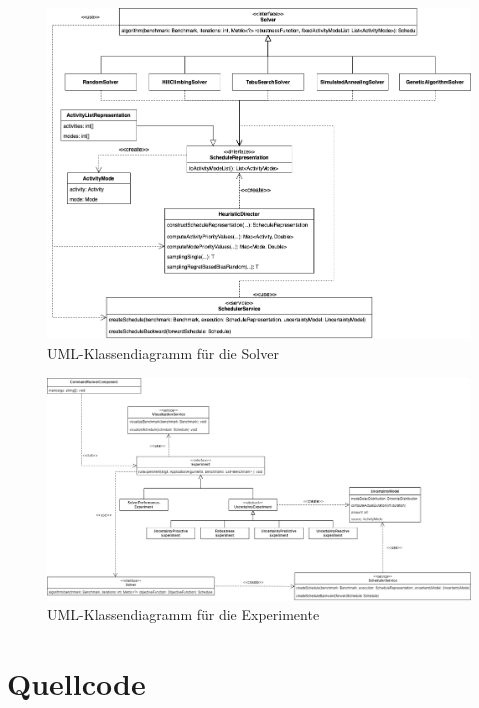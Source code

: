 \begin{figure}
    \centering
    \includegraphics[width=1.06\textwidth]{assets/img/04_Umsetzung/KlassendiagrammSolver.png}
    \caption{UML-Klassendiagramm für die Solver} 
    \label{img:mrcpsp_framework_solver}
\end{figure}

\begin{figure}
    \centering
    \includegraphics[angle=90,height=0.92\textheight]{assets/img/04_Umsetzung/Klassendiagramm_Experiments.drawio.png}
    \caption{UML-Klassendiagramm für die Experimente} 
    \label{img:mrcpsp_framework_experimente}
\end{figure}

\chapter{Quellcode}


